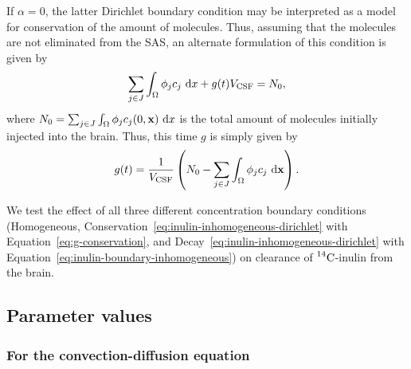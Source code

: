 \documentclass[10pt]{article}
\newcommand{\1}{^{(1)}}
\newcommand{\2}{^{(2)}}
\newcommand*{\dd}{\mathop{\kern0pt\mathrm{d}}\!{}}
\newcommand {\x}   {\mathbf{x}}
\newcommand{\Cinulin}{$\prescript{14}{}{\text{C}}$-inulin }
\newtheorem{remark}[theorem]{Remark}
\begin{document}
If $\alpha = 0$, the latter Dirichlet boundary condition may be interpreted as a model for conservation of the amount of molecules. Thus, assuming that the molecules are not eliminated from the SAS, an alternate formulation of this condition is given by
\begin{equation}
    \sum_{j\in J} \int_\Omega  \phi_j c_j \,\dd x + g(t) V_{\text{CSF}} = N_0,
    \label{eq:inulin-tracer-conservation}
\end{equation}
where $N_0 = \sum_{j\in J} \int_\Omega  \phi_j c_j(0,\x) \,\dd x $ is the total amount of molecules initially injected into the brain. Thus, this time $g$ is simply given by 
\begin{equation}
    g(t) = \frac{1}{ V_{\text{CSF}}}\left( N_0  - \sum_{j\in J} \int_\Omega  \phi_j c_j \,\dd \x \right) .
    \label{eq:g-conservation}
\end{equation}

We test the effect of all three different concentration boundary conditions (Homogeneous, Conservation~\eqref{eq:inulin-inhomogeneous-dirichlet} with Equation~\eqref{eq:g-conservation}, and Decay~\eqref{eq:inulin-inhomogeneous-dirichlet} with Equation~\eqref{eq:inulin-boundary-inhomogeneous}) on clearance of \Cinulin from the brain. 




\subsection{Parameter values}
\label{subsec:para-values}

\subsubsection{For the convection-diffusion equation}
\end{document}
